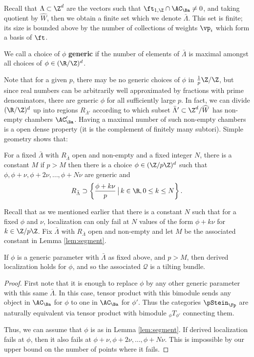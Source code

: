 Recall that $\Lambda\subset \Z^d$ are the vectors such that
$\ft_{1,\Z}\cap\AC_{\Ba}\neq 0$, and taking quotient by $\widehat{W}$, then we obtain a finite set which we denote $\bar \Lambda$.  This set is finite; its size is bounded above by the number of collections of weights $\vp_i$ which form a basis of $\ft$.  
\begin{definition}
 We call a choice of $\phi$ {\bf generic} if the number of elements of $ \bar \Lambda$ is maximal amongst all choices of $\phi\in (\R/\Z)^d$.  
\end{definition}
Note that for a given $p$, there may be no generic choices of $\phi$ in $\frac{1}{p}\Z/\Z$, but since real numbers can be arbitrarily well approximated by fractions with prime denominators, there are generic $\phi$ for all sufficiently large $p$.   In fact, we can divide $(\R/\Z)^d$ up into regions $R_{\bar{\Lambda}'}$ according to  which subset $\bar \Lambda'\subset \Z^d/\widehat{W}$ has non-empty chambers $\AC'_\Ba$.  Having a maximal number of such non-empty chambers is a open dense property (it is the complement of finitely many subtori).  Simple geometry shows that:
\begin{lemma}\label{lem:segment}
For a fixed $\bar{\Lambda}$ with $R_{\bar{\Lambda}}$ open and non-empty and a fixed integer $N$, there is a constant $M$ if $p>M$ then there is a choice $\phi\in (\Z/p\Z)^d$ such that $\phi,\phi+\nu,\phi+2\nu,\dots, \phi+N\nu$ are generic and \[R_{\bar{\Lambda}}\supset \left\{\frac{\phi+k\nu}{p}\,\big| \,k\in \R, 0\leq k\leq N\right\}.\]
\end{lemma}
Recall that as we mentioned earlier that there is a constant $N$ such that for a fixed $\phi$ and $\nu$, localization can only fail at $N$ values of the form $\phi+k\nu$ for $k\in \Z/p\Z$.  Fix $\bar{\Lambda}$ with $R_{\bar{\Lambda}}$ open and non-empty and let $M$ be the associated constant in Lemma \ref{lem:segment}.
\begin{theorem}\label{thm:asymptotic-derived}
  If $\phi$ is a generic parameter with $\bar{\Lambda}$ as fixed above, and $p>M$, then derived localization holds for $\phi$, and so the associated $\mathcal{Q}$ is a tilting bundle.  
\end{theorem}
\begin{proof}
  First note that it is enough to replace $\phi$ by any other generic parameter with this same $\bar{\Lambda}$. In this case,  tensor product with this bimodule sends any object in $\AC_{\Ba}$ for $\phi$ to one in $\AC_{\Ba}$ for $\phi'$.  Thus the categories $\pStein_\Fp$ are naturally equivalent via tensor product with bimodule ${}_{\phi}T_{\phi'}$ connecting them. 
  
  Thus, we can assume that $\phi$ is as in Lemma \ref{lem:segment}.  If derived localization fails at $\phi$, then it also fails at $\phi+\nu,\phi+2\nu,\dots, \phi+N\nu$.  This is impossible by our upper bound on the number of points where it fails.  
\end{proof}

